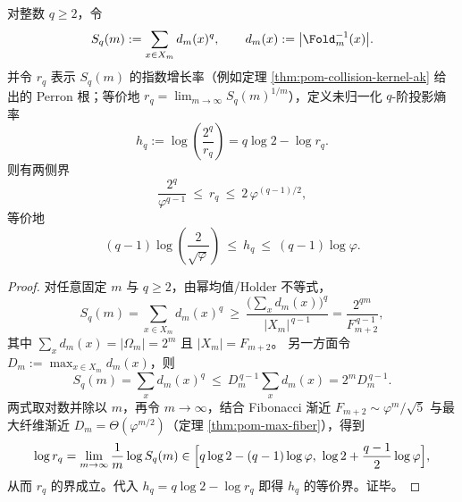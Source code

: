 \begin{proposition}\label{prop:pom-rq-universal-bounds}
对整数 \(q\ge 2\)，令
$$
S_q(m):=\sum_{x\in X_m} d_m(x)^q,\qquad d_m(x):=\bigl|\Fold_m^{-1}(x)\bigr|.
$$
并令 \(r_q\) 表示 \(S_q(m)\) 的指数增长率（例如定理 \ref{thm:pom-collision-kernel-ak} 给出的 Perron 根；等价地 \(r_q=\lim_{m\to\infty}S_q(m)^{1/m}\)），定义未归一化 \(q\)-阶投影熵率
$$
h_q:=\log\!\left(\frac{2^q}{r_q}\right)=q\log 2-\log r_q.
$$
则有两侧界
$$
\frac{2^q}{\varphi^{q-1}}\ \le\ r_q\ \le\ 2\,\varphi^{(q-1)/2},
$$
等价地
$$
(q-1)\log\!\left(\frac{2}{\sqrt{\varphi}}\right)\ \le\ h_q\ \le\ (q-1)\log\varphi.
$$
\end{proposition}
\begin{proof}
对任意固定 \(m\) 与 \(q\ge 2\)，由幂均值/Holder 不等式，
$$
S_q(m)=\sum_{x\in X_m}d_m(x)^q\ \ge\ \frac{\bigl(\sum_x d_m(x)\bigr)^q}{|X_m|^{\,q-1}}
=\frac{2^{qm}}{F_{m+2}^{\,q-1}},
$$
其中 \(\sum_x d_m(x)=|\Omega_m|=2^m\) 且 \(|X_m|=F_{m+2}\)。
另一方面令 \(D_m:=\max_{x\in X_m} d_m(x)\)，则
$$
S_q(m)=\sum_x d_m(x)^q\ \le\ D_m^{\,q-1}\sum_x d_m(x)=2^m D_m^{\,q-1}.
$$
两式取对数并除以 \(m\)，再令 \(m\to\infty\)，结合 Fibonacci 渐近 \(F_{m+2}\sim \varphi^{m}/\sqrt5\) 与最大纤维渐近 \(D_m=\Theta(\varphi^{m/2})\)（定理 \ref{thm:pom-max-fiber}），得到
$$
\log r_q=\lim_{m\to\infty}\frac{1}{m}\log S_q(m)\in\Bigl[q\log 2-(q-1)\log\varphi,\ \log 2+\frac{q-1}{2}\log\varphi\Bigr],
$$
从而 \(r_q\) 的界成立。代入 \(h_q=q\log 2-\log r_q\) 即得 \(h_q\) 的等价界。证毕。
\end{proof}

